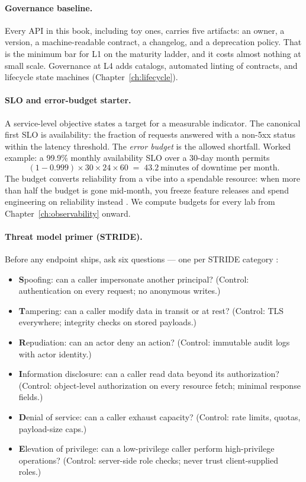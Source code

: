 \paragraph{Governance baseline.}
Every API in this book, including toy ones, carries five artifacts: an owner,
a version, a machine-readable contract, a changelog, and a deprecation
policy. That is the minimum bar for L1 on the maturity ladder, and it costs
almost nothing at small scale. Governance at L4 adds catalogs, automated
linting of contracts, and lifecycle state machines (Chapter~\ref{ch:lifecycle}).

\paragraph{SLO and error-budget starter.}
A service-level objective states a target for a measurable indicator. The
canonical first SLO is availability: the fraction of requests answered with a
non-5xx status within the latency threshold. The \emph{error budget} is the
allowed shortfall. Worked example: a 99.9\% monthly availability SLO over a
30-day month permits
\begin{equation}
  (1 - 0.999) \times 30 \times 24 \times 60 \;=\; 43.2
  \ \text{minutes of downtime per month.}
  \label{eq:ch0-errorbudget}
\end{equation}
The budget converts reliability from a vibe into a spendable resource: when
more than half the budget is gone mid-month, you freeze feature releases and
spend engineering on reliability instead \cite{beyer2016sre}. We compute
budgets for every lab from Chapter~\ref{ch:observability} onward.

\paragraph{Threat model primer (STRIDE).}
Before any endpoint ships, ask six questions --- one per STRIDE category
\cite{gehl2021apidesign}:

\begin{itemize}
  \item \textbf{S}poofing: can a caller impersonate another principal?
        (Control: authentication on every request; no anonymous writes.)
  \item \textbf{T}ampering: can a caller modify data in transit or at rest?
        (Control: TLS everywhere; integrity checks on stored payloads.)
  \item \textbf{R}epudiation: can an actor deny an action?
        (Control: immutable audit logs with actor identity.)
  \item \textbf{I}nformation disclosure: can a caller read data beyond its
        authorization? (Control: object-level authorization on every
        resource fetch; minimal response fields.)
  \item \textbf{D}enial of service: can a caller exhaust capacity?
        (Control: rate limits, quotas, payload-size caps.)
  \item \textbf{E}levation of privilege: can a low-privilege caller perform
        high-privilege operations? (Control: server-side role checks; never
        trust client-supplied roles.)
\end{itemize}

